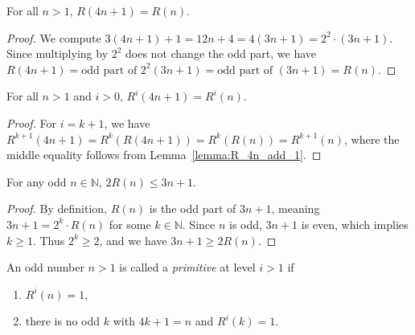 \begin{lemma}\label{lemma:R_4n_add_1}\leanok
For all $n > 1$, $R(4n + 1) = R(n)$.
\end{lemma}
\begin{proof}\leanok
We compute $3(4n+1) + 1 = 12n + 4 = 4(3n+1) = 2^2 \cdot (3n+1)$. Since multiplying by $2^2$ does not change the odd part, we have $R(4n+1) = \text{odd part of } 2^2(3n+1) = \text{odd part of } (3n+1) = R(n)$.
\end{proof}
\begin{lemma}\label{lemma:R_iter_4n_add_1}\leanok
For all $n > 1$ and $i > 0$, $R^i(4n + 1) = R^i(n)$.
\end{lemma}
\begin{proof}\leanok
For $i = k + 1$, we have
$R^{k+1}(4n+1) = R^k(R(4n+1)) = R^k(R(n)) = R^{k+1}(n)$,
where the middle equality follows from Lemma~\ref{lemma:R_4n_add_1}.
\end{proof}

\begin{lemma}\label{lemma:rcs_ge}\leanok
For any odd $n \in \mathbb{N}$, $2 R(n) \le 3n + 1$.
\end{lemma}
\begin{proof}\leanok
By definition, $R(n)$ is the odd part of $3n + 1$, meaning $3n + 1 = 2^k \cdot R(n)$ for some $k \in \mathbb{N}$. Since $n$ is odd, $3n + 1$ is even, which implies $k \ge 1$. Thus $2^k \ge 2$, and we have $3n + 1 \ge 2 R(n)$.
\end{proof}

\begin{definition}\label{def:IsPrimitive4x1}\leanok
An odd number $n > 1$ is called a \emph{primitive} at level $i > 1$ if
\begin{enumerate}
\item $R^i(n) = 1$,
\item there is no odd $k$ with $4k + 1 = n$ and $R^i(k) = 1$.
\end{enumerate}
\end{definition}

